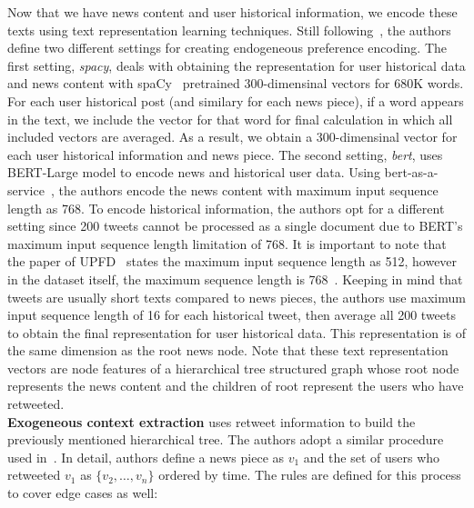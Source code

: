 Now that we have news content and user historical information, we encode these texts using text representation learning techniques. Still following~\cite{UPFD_Dataset_Shu}, the authors define two different settings for creating endogeneous preference encoding. The first setting, \emph{spacy}, deals with obtaining the representation for user historical data and news content with spaCy~\parencite{SpaCy_Honnibal} pretrained 300-dimensinal vectors for 680K words. For each user historical post (and similary for each news piece), if a word appears in the text, we include the vector for that word for final calculation in which all included vectors are averaged. As a result, we obtain a 300-dimensinal vector for each user historical information and news piece. The second setting, \emph{bert}, uses BERT-Large model to encode news and historical user data. Using bert-as-a-service~\parencite{BertAsAService_Xiao}, the authors encode the news content with maximum input sequence length as 768. To encode historical information, the authors opt for a different setting since 200 tweets cannot be processed as a single document due to BERT's maximum input sequence length limitation of 768. It is important to note that the paper of UPFD~\parencite{UPFD_Dataset_Shu} states the maximum input sequence length as 512, however in the dataset itself, the maximum sequence length is 768~\parencite{UPFD_PyGTeam}. Keeping in mind that tweets are usually short texts compared to news pieces, the authors use maximum input sequence length of 16 for each historical tweet, then average all 200 tweets to obtain the final representation for user historical data. This representation is of the same dimension as the root news node. Note that these text representation vectors are node features of a hierarchical tree structured graph whose root node represents the news content and the children of root represent the users who have retweeted.\\
\textbf{Exogeneous context extraction} uses retweet information to build the previously mentioned hierarchical tree. The authors adopt a similar procedure used in~\cite{GraphNeuralNetworksWithContinualLearningFakeNewsDetection_Han,GeometricDeepLearningOnGraphsAndManifolds_Monti,HierarchicalPropagationNetworksForFND_Shu}. In detail, authors define a news piece as $v_1$ and the set of users who retweeted $v_1$ as $\{v_2, \dots , v_n\}$ ordered by time. The rules are defined for this process to cover edge cases as well:
